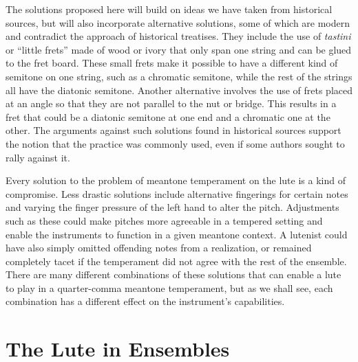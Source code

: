 The solutions proposed here will build on ideas we have taken from historical
sources, but will also incorporate alternative solutions, some of which are
modern and contradict the approach of historical treatises. They include the use
of \textit{tastini} or ``little frets'' made of wood or ivory that only span one
string and can be glued to the fret board.  These small frets make it possible
to have a different kind of semitone on one string, such as a chromatic
semitone, while the rest of the strings all have the diatonic semitone.  Another
alternative involves the use of frets placed at an angle so that they are not
parallel to the nut or bridge.  This results in a fret that could be a diatonic
semitone at one end and a chromatic one at the other.  The arguments against
such solutions found in historical sources support the notion that the practice
was commonly used, even if some authors sought to rally against it.

Every solution to the problem of meantone temperament on the lute is a kind of
compromise.  Less drastic solutions include alternative fingerings for certain
notes and varying the finger pressure of the left hand to alter the pitch.
Adjustments such as these could make pitches more agreeable in a tempered
setting and enable the instruments to function in a given meantone context.  A
lutenist could have also simply omitted offending notes from a realization, or
remained completely tacet if the  temperament did not agree with the rest of the
ensemble.  There are many different combinations of these solutions that can
enable a lute to play in a quarter-comma meantone temperament, but as we shall
see, each combination has a different effect on the instrument's capabilities.

\section{The Lute in Ensembles}

